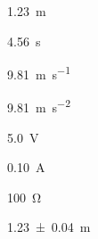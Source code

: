 
\SI{1.23}{\meter}

\SI{4.56}{\second}

\SI{9.81}{\meter\per\second}

\SI{9.81}{\meter\per\second\squared}

\SI{5.0}{\volt}

\SI{0.10}{\ampere}

\SI{100}{\ohm}

\SI{1.23 \pm 0.04}{\meter}
